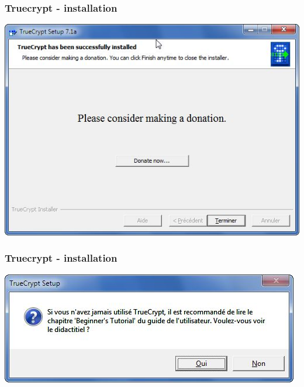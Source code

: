 \documentclass{beamer}
\begin{document}
\begin{frame}
\frametitle{Truecrypt - installation}
\begin{center}
\includegraphics[scale=0.5] {./images/Truecrypt_install05.jpg}
\end{center}
\end{frame}
\begin{frame}
\frametitle{Truecrypt - installation}
\begin{center}
\includegraphics[scale=0.5] {./images/Truecrypt_install06.jpg}
\end{center}
\end{frame}
\end{document}
